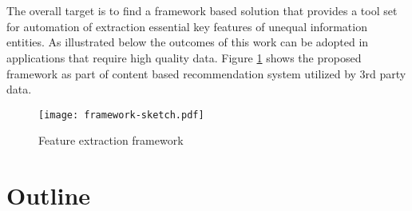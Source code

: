 \\\\
The overall target is to find a framework based solution that provides a tool set for automation of extraction essential key features of unequal information entities. As illustrated below the outcomes of this work can be adopted in applications that require high quality data. Figure \ref{fig:framework-sketch} shows the proposed framework as part of content based recommendation system utilized by 3rd party data.
\\
\begin{figure}[htb]
  \centering
  \texttt{[image: framework-sketch.pdf]}\\
  \caption{Feature extraction framework}\label{fig:framework-sketch}
\end{figure}

\section{Outline\label{sec:outline}}

